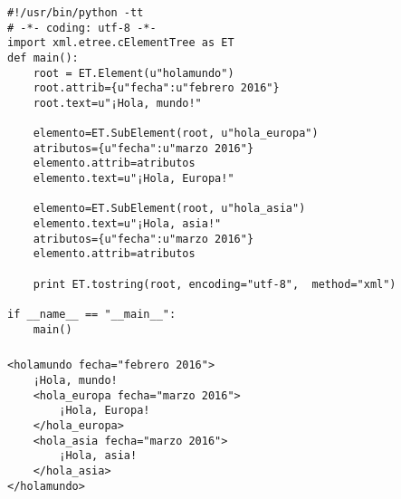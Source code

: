 \documentclass[ucs]{beamer}
\begin{document}
\begin{frame}[fragile]
\frametitle{}

  \begin{footnotesize}
  \begin{verbatim}
#!/usr/bin/python -tt
# -*- coding: utf-8 -*-
import xml.etree.cElementTree as ET
def main():
    root = ET.Element(u"holamundo")
    root.attrib={u"fecha":u"febrero 2016"}
    root.text=u"¡Hola, mundo!"

    elemento=ET.SubElement(root, u"hola_europa")
    atributos={u"fecha":u"marzo 2016"}
    elemento.attrib=atributos
    elemento.text=u"¡Hola, Europa!"

    elemento=ET.SubElement(root, u"hola_asia")
    elemento.text=u"¡Hola, asia!"
    atributos={u"fecha":u"marzo 2016"}
    elemento.attrib=atributos

    print ET.tostring(root, encoding="utf-8",  method="xml")

if __name__ == "__main__":
    main()
  \end{verbatim}
  \end{footnotesize}

\end{frame}


\begin{frame}[fragile]
\frametitle{}

  \begin{footnotesize}
  \begin{verbatim}
<holamundo fecha="febrero 2016">
    ¡Hola, mundo!
    <hola_europa fecha="marzo 2016">
        ¡Hola, Europa!
    </hola_europa>
    <hola_asia fecha="marzo 2016">
        ¡Hola, asia!
    </hola_asia>
</holamundo>
  \end{verbatim}
  \end{footnotesize}
\end{frame}
\end{document}
